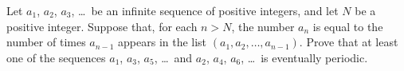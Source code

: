 Let $a_1$, $a_2$, $a_3$, \dots\ be an infinite sequence of positive integers,
and let $N$ be a positive integer.
Suppose that, for each $n > N$,
the number $a_n$ is equal to the number of times $a_{n-1}$ appears
in the list $(a_1, a_2, \dots, a_{n-1})$.
Prove that at least one of the sequences $a_1$, $a_3$, $a_5$, \dots\
and $a_2$, $a_4$, $a_6$, \dots\ is eventually periodic.